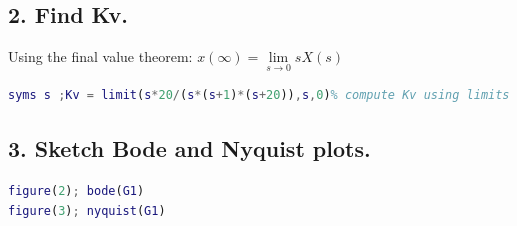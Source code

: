 {\subsection*{2. Find Kv.}
Using the final value theorem: $x(\infty ) = \mathop {\lim }\limits_{s \to 0} sX(s)$ \newline 

\begin{lstlisting}[language = Matlab,frame=single,caption={}]
syms s ;Kv = limit(s*20/(s*(s+1)*(s+20)),s,0)% compute Kv using limits
\end{lstlisting}


% 
% 
    

\subsection*{3. Sketch Bode and Nyquist plots.}


\begin{lstlisting}[language = Matlab,frame=single,caption={}]
figure(2); bode(G1)
figure(3); nyquist(G1)
\end{lstlisting}

}
